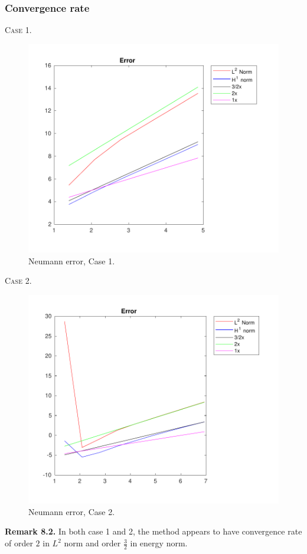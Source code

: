 \documentclass[a4paper]{article}
\numberwithin{equation}{section}
\begin{document}
\subsubsection{Convergence rate}
\textsc{Case 1.}
\begin{figure}[H]
\centering\includegraphics[width=13cm]{fig_neumann_error_G2_CP1_I1_M6_C1}
\caption{Neumann error, Case 1.}
\end{figure}
\newpage
\textsc{Case 2.}
\begin{figure}[H]
\centering\includegraphics[width=13cm]{fig_neumann_error_G1_CP1_I1_M9_C2}
\caption{Neumann error, Case 2.}
\end{figure}
\noindent\textbf{Remark 8.2.} In both case 1 and 2, the method appears to have convergence rate of order $2$ in $L^2$ norm and order $\frac{3}{2}$ in energy norm.
\end{document}
